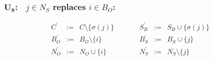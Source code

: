 \documentclass[a4paper]{article}
\begin{document}
\subsubsection{$\mathbf{U_{8}}$:$\quad j \in N_{S}$ replaces $i \in B_{O}$:}
\begin{equation}
\label{update:s_rep_o}
\begin{array}{ccccccc}
C^{\prime}      &:=&  C \setminus \{\sigma(j)\}
&\quad\quad&
S_{B}^{\prime}  &:=&  S_{B} \cup \{\sigma(j)\} \\
B_{O}^{\prime}  &:=&  B_{O} \setminus \{i\}
&\quad\quad&
B_{S}^{\prime}  &:=&  B_{S} \cup \{j\}  \\
N_{O}^{\prime}  &:=&  N_{O} \cup \{i\}
&\quad\quad&
N_{S}^{\prime}  &:=&  N_{S} \setminus \{j\} 
\end{array}
\end{equation}
\end{document}
